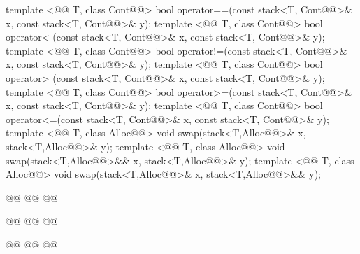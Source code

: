 \documentclass[american,twoside]{book}
\begin{document}
\begin{codeblock}
{  template <@@ T, class Cont@@>
    bool operator==(const stack<T, Cont@@>& x, const stack<T, Cont@@>& y);
  template <@@ T, class Cont@@>
    bool operator< (const stack<T, Cont@@>& x, const stack<T, Cont@@>& y);
  template <@@ T, class Cont@@>
    bool operator!=(const stack<T, Cont@@>& x, const stack<T, Cont@@>& y);
  template <@@ T, class Cont@@>
    bool operator> (const stack<T, Cont@@>& x, const stack<T, Cont@@>& y);
  template <@@ T, class Cont@@>
    bool operator>=(const stack<T, Cont@@>& x, const stack<T, Cont@@>& y);
  template <@@ T, class Cont@@>
    bool operator<=(const stack<T, Cont@@>& x, const stack<T, Cont@@>& y);
  template <@@ T, class Alloc@@>
    void swap(stack<T,Alloc@@>& x, stack<T,Alloc@@>& y);
  template <@@ T, class Alloc@@>
    void swap(stack<T,Alloc@@>&& x, stack<T,Alloc@@>& y);
  template <@@ T, class Alloc@@>
    void swap(stack<T,Alloc@@>& x, stack<T,Alloc@@>&& y);

  @@
    @@
    @@

  @@
    @@
      @@

  @@
    @@
      @@
}
\end{codeblock}
\end{document}
